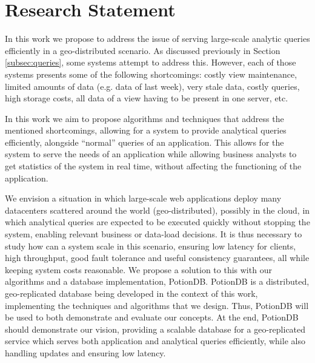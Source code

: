 
%

\chapter{Research Statement}
\label{cha:research_statement}



In this work we propose to address the issue of serving large-scale analytic queries efficiently in a geo-distributed scenario.
As discussed previously in Section \ref{subsec:queries}, some systems attempt to address this.
However, each of those systems presents some of the following shortcomings: costly view maintenance, limited amounts of data (e.g. data of last week), very stale data, costly queries, high storage costs, all data of a view having to be present in one server, etc.

In this work we aim to propose algorithms and techniques that address the mentioned shortcomings, allowing for a system to provide analytical queries efficiently, alongside ``normal'' queries of an application.
This allows for the system to serve the needs of an application while allowing business analysts to get statistics of the system in real time, without affecting the functioning of the application.

We envision a situation in which large-scale web applications deploy many datacenters scattered around the world (geo-distributed), possibly in the cloud, in which analytical queries are expected to be executed quickly without stopping the system, enabling relevant business or data-load decisions.
It is thus necessary to study how can a system scale in this scenario, ensuring low latency for clients, high throughput, good fault tolerance and useful consistency guarantees, all while keeping system costs reasonable.
We propose a solution to this with our algorithms and a database implementation, PotionDB.
PotionDB is a distributed, geo-replicated database being developed in the context of this work, implementing the techniques and algorithms that we design.
Thus, PotionDB will be used to both demonstrate and evaluate our concepts.
At the end, PotionDB should demonstrate our vision, providing a scalable database for a geo-replicated service which serves both application and analytical queries efficiently, while also handling updates and ensuring low latency.

